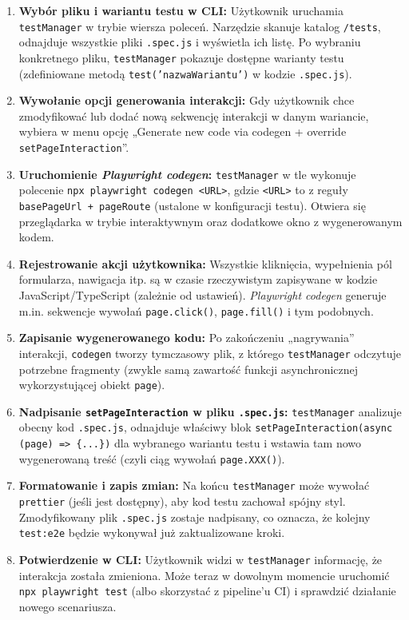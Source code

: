 \documentclass[12pt]{report}
\begin{document}
\begin{enumerate}
    \item \textbf{Wybór pliku i wariantu testu w CLI:} Użytkownik uruchamia \texttt{testManager} w trybie wiersza poleceń. Narzędzie skanuje katalog \texttt{/tests}, odnajduje wszystkie pliki \texttt{.spec.js} i wyświetla ich listę. Po wybraniu konkretnego pliku, \texttt{testManager} pokazuje dostępne warianty testu (zdefiniowane metodą \texttt{test('nazwaWariantu')} w kodzie \texttt{.spec.js}).
    \item \textbf{Wywołanie opcji generowania interakcji:} Gdy użytkownik chce zmodyfikować lub dodać nową sekwencję interakcji w danym wariancie, wybiera w menu opcję „Generate new code via codegen + override \texttt{setPageInteraction}”. 
    \item \textbf{Uruchomienie \emph{Playwright codegen}:} \texttt{testManager} w tle wykonuje polecenie \texttt{npx playwright codegen <URL>}, gdzie \texttt{<URL>} to z reguły \texttt{basePageUrl + pageRoute} (ustalone w konfiguracji testu). Otwiera się przeglądarka w trybie interaktywnym oraz dodatkowe okno z wygenerowanym kodem.
    \item \textbf{Rejestrowanie akcji użytkownika:} Wszystkie kliknięcia, wypełnienia pól formularza, nawigacja itp. są w czasie rzeczywistym zapisywane w kodzie JavaScript/TypeScript (zależnie od ustawień). \emph{Playwright codegen} generuje m.in. sekwencje wywołań \texttt{page.click()}, \texttt{page.fill()} i tym podobnych.
    \item \textbf{Zapisanie wygenerowanego kodu:} Po zakończeniu „nagrywania” interakcji, \texttt{codegen} tworzy tymczasowy plik, z którego \texttt{testManager} odczytuje potrzebne fragmenty (zwykle samą zawartość funkcji asynchronicznej wykorzystującej obiekt \texttt{page}).
    \item \textbf{Nadpisanie \texttt{setPageInteraction} w pliku \texttt{.spec.js}:} \texttt{testManager} analizuje obecny kod \texttt{.spec.js}, odnajduje właściwy blok \texttt{setPageInteraction(async (page) => \{...\})} dla wybranego wariantu testu i wstawia tam nowo wygenerowaną treść (czyli ciąg wywołań \texttt{page.XXX()}). 
    \item \textbf{Formatowanie i zapis zmian:} Na końcu \texttt{testManager} może wywołać \texttt{prettier} (jeśli jest dostępny), aby kod testu zachował spójny styl. Zmodyfikowany plik \texttt{.spec.js} zostaje nadpisany, co oznacza, że kolejny \texttt{test:e2e} będzie wykonywał już zaktualizowane kroki.
    \item \textbf{Potwierdzenie w CLI:} Użytkownik widzi w \texttt{testManager} informację, że interakcja została zmieniona. Może teraz w dowolnym momencie uruchomić \texttt{npx playwright test} (albo skorzystać z pipeline’u CI) i sprawdzić działanie nowego scenariusza.
\end{enumerate}
\end{document}
